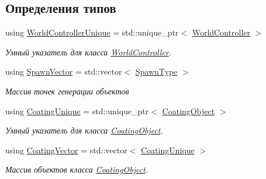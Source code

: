 \subsection*{Определения типов}
\begin{DoxyCompactItemize}
\item 
\mbox{\label{namespacertm_a3081db54851f6008db32c1ee28d14ecf}} 
using \hyperlink{namespacertm_a3081db54851f6008db32c1ee28d14ecf}{World\+Controller\+Unique} = std\+::unique\+\_\+ptr$<$ \hyperlink{classrtm_1_1_world_controller}{World\+Controller} $>$
\begin{DoxyCompactList}\small\item\em Умный указатель для класса \hyperlink{classrtm_1_1_world_controller}{World\+Controller}. \end{DoxyCompactList}\item 
\mbox{\label{namespacertm_a9945e0a1add3159b49ccf7bad512ad70}} 
using \hyperlink{namespacertm_a9945e0a1add3159b49ccf7bad512ad70}{Spawn\+Vector} = std\+::vector$<$ \hyperlink{structrtm_1_1_spawn_type}{Spawn\+Type} $>$
\begin{DoxyCompactList}\small\item\em Массив точек генерации объектов \end{DoxyCompactList}\item 
\mbox{\label{namespacertm_ab0ec616a26920aeaf720d04e041e8ce3}} 
using \hyperlink{namespacertm_ab0ec616a26920aeaf720d04e041e8ce3}{Coating\+Unique} = std\+::unique\+\_\+ptr$<$ \hyperlink{classrtm_1_1_coating_object}{Coating\+Object} $>$
\begin{DoxyCompactList}\small\item\em Умный указатель для класса \hyperlink{classrtm_1_1_coating_object}{Coating\+Object}. \end{DoxyCompactList}\item 
\mbox{\label{namespacertm_ab16d0c62e4a4cf29f24dac0b8507faf6}} 
using \hyperlink{namespacertm_ab16d0c62e4a4cf29f24dac0b8507faf6}{Coating\+Vector} = std\+::vector$<$ \hyperlink{namespacertm_ab0ec616a26920aeaf720d04e041e8ce3}{Coating\+Unique} $>$
\begin{DoxyCompactList}\small\item\em Массив объектов класса \hyperlink{classrtm_1_1_coating_object}{Coating\+Object}. \end{DoxyCompactList}\item 

\end{DoxyCompactItemize}
